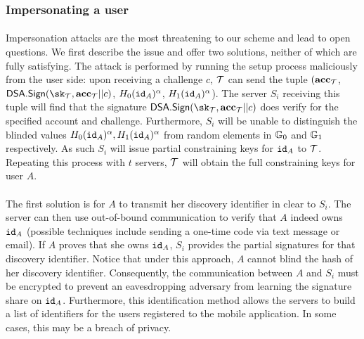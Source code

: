 \subsubsection{Impersonating a user}
\label{sec:impersonation}

\paragraph{} Impersonation attacks are the most threatening to our scheme and lead to open questions. We first describe the issue and offer two solutions, neither of which are fully satisfying. The attack is performed by running the setup process maliciously from the user side: upon receiving a challenge $c$, $\mathcal{T}$ can send the tuple $(\mathbf{acc}_{\mathcal{T}}$, $\SIG.\Sign(\sk_{\Tadv}, \acc_{\Tadv}||c)$, $H_0(\mathtt{id}_A)^\alpha$, $H_1(\mathtt{id}_A)^\alpha$). The server $S_i$ receiving this tuple will find that the signature $\SIG.\Sign(\sk_{\Tadv}, \acc_{\Tadv}||c)$ does verify for the specified account and challenge. Furthermore, $S_i$ will be unable to distinguish the blinded values $H_0(\mathtt{id}_A)^\alpha, H_1(\mathtt{id}_A)^\alpha$ from random elements in $\mathbb{G}_0$ and $\mathbb{G}_1$ respectively. As such $S_i$ will issue partial constraining keys for $\mathtt{id}_A$ to $\mathcal{T}$. Repeating this process with $t$ servers, $\mathcal{T}$ will obtain the full constraining keys for user $A$.

\paragraph{} The first solution is for $A$ to transmit her discovery identifier in clear to $S_i$. The server can then use out-of-bound communication to verify that $A$ indeed owns $\mathtt{id}_A$ (possible techniques include sending a one-time code via text message or email). If $A$ proves that she owns $\mathtt{id}_A$, $S_i$ provides the partial signatures for that discovery identifier. Notice that under this approach, $A$ cannot blind the hash of her discovery identifier. Consequently, the communication between $A$ and $S_i$ must be encrypted to prevent an eavesdropping adversary from learning the signature share on $\mathtt{id}_A$. Furthermore, this identification method allows the servers to build a list of identifiers for the users registered to the mobile application. In some cases, this may be a breach of privacy.

